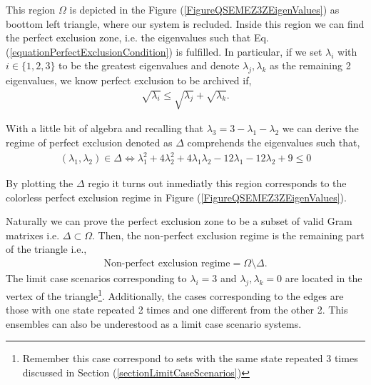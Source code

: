 \documentclass[12pt,letterpaper]{article}
\begin{document}
This region $\Omega$ is depicted in the Figure (\ref{FigureQSEMEZ3ZEigenValues}) as boottom left triangle, where our system is recluded. Inside this region we can find the perfect exclusion zone, i.e. the eigenvalues such that Eq.(\ref{equationPerfectExclusionCondition}) is fulfilled. In particular, if we set $\lambda_i$ with $i\in\{1,2,3\}$ to be the greatest eigenvalues and denote $\lambda_j,\lambda_k$ as the remaining 2 eigenvalues, we know perfect exclusion to be archived if,
\begin{align*}
	\sqrt{\lambda_i}\leq \sqrt{\lambda_j}+\sqrt{\lambda_k}.
\end{align*}

With a little bit of algebra and recalling that $\lambda_3=3-\lambda_1-\lambda_2$ we can derive the regime of perfect exclusion denoted as $\Delta$ comprehends the eigenvalues such that,
\begin{align*}
	(\lambda_1,\lambda_2)\in \Delta\Leftrightarrow\lambda_1^2 + 4\lambda_2^2 + 4\lambda_1\lambda_2 - 12\lambda_1 - 12\lambda_2 + 9 \leq 0
\end{align*}

By plotting the $\Delta$ regio it turns out inmediatly this region corresponds to the colorless perfect exclusion regime in Figure (\ref{FigureQSEMEZ3ZEigenValues}).


Naturally we can prove the perfect exclusion zone to be a subset of valid Gram matrixes i.e. $\Delta\subset \Omega$. Then, the non-perfect exclusion regime is the remaining part of the triangle i.e.,
\begin{align*}
	\text{Non-perfect exclusion regime}=\Omega\setminus \Delta.
\end{align*}
The limit case scenarios corresponding to $\lambda_i=3$ and $\lambda_j,\lambda_k=0$ are located in the vertex of the triangle\footnote{Remember this case correspond to sets with the same state repeated 3 times discussed in Section (\ref{sectionLimitCaseScenarios})}. Additionally, the cases corresponding to the edges are those with one state repeated 2 times and one different from the other 2. This ensembles can also be underestood as a limit case scenario systems.
\end{document}
